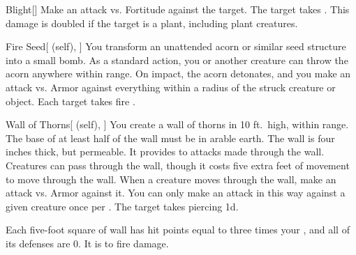 \lowercase{\hypertarget{spell:Blight}{}}\label{spell:Blight}
\begin{freeability}[Rank 3]{\hypertarget{spell:Blight}{Blight}}[]
Make an attack vs. Fortitude against the target.
\hit The target takes .
This damage is doubled if the target is a plant, including plant creatures.
\end{freeability}
\vspace{0.25em}



\lowercase{\hypertarget{spell:Fire Seed}{}}\label{spell:Fire Seed}
\begin{attuneability}[Rank 3]{\hypertarget{spell:Fire Seed}{Fire Seed}}[ (self), ]
You transform an unattended acorn or similar seed structure into a small bomb.
As a standard action, you or another creature can throw the acorn anywhere within \rngclose range.
On impact, the acorn detonates, and you make an attack vs. Armor against everything within a \areasmall radius of the struck creature or object.
\hit Each target takes fire .
\end{attuneability}
\vspace{0.25em}



\lowercase{\hypertarget{spell:Wall of Thorns}{}}\label{spell:Wall of Thorns}
\begin{attuneability}[Rank 3]{\hypertarget{spell:Wall of Thorns}{Wall of Thorns}}[ (self), ]
You create a wall of thorns in 10 ft.\ high, \areamed {} within \rngmed range.
The base of at least half of the wall must be in arable earth.
The wall is four inches thick, but permeable.
It provides  to attacks made through the wall.
Creatures can pass through the wall, though it costs five extra feet of movement to move through the wall.
When a creature moves through the wall, make an attack vs. Armor against it.
You can only make an attack in this way against a given creature once per .
\hit The target takes piercing  \minus1d.

Each five-foot square of wall has hit points equal to three times your , and all of its defenses are 0.
It is  to fire damage.
\end{attuneability}
\vspace{0.25em}



